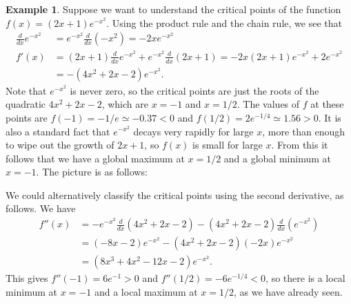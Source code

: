 \documentclass[reqno]{amsart}
\theoremstyle{definition}
\newtheorem{example}[theorem]{Example}
\begin{document}
\begin{example}
 Suppose we want to understand the critical points of the function
 $f(x)=(2x+1)e^{-x^2}$.  Using the product rule and the chain rule, we
 see that 
 \begin{align*}
  \tfrac{d}{dx}e^{-x^2} &= e^{-x^2} \tfrac{d}{dx}(-x^2) = -2xe^{-x^2} \\
  f'(x) &= (2x+1)\tfrac{d}{dx}e^{-x^2} + e^{-x^2}\tfrac{d}{dx}(2x+1) 
         = -2x(2x+1)e^{-x^2} + 2e^{-x^2}  \\
        &= -(4x^2+2x-2)e^{-x^2}.
 \end{align*}
 Note that $e^{-x^2}$ is never zero, so the critical points are just
 the roots of the quadratic $4x^2+2x-2$, which are $x=-1$ and $x=1/2$.
 The values of $f$ at these points are $f(-1)=-1/e\simeq -0.37<0$ and
 $f(1/2)=2e^{-1/4}\simeq 1.56>0$.  It is also a standard fact that
 $e^{-x^2}$ decays very rapidly for large $x$, more than enough to
 wipe out the growth of $2x+1$, so $f(x)$ is small for large $x$.
 From this it follows that we have a global maximum at $x=1/2$ and a
 global minimum at $x=-1$.  The picture is as follows:
 \begin{center}
 \end{center} 
 We could alternatively classify the critical points using the second
 derivative, as follows.  We have
 \begin{align*}
  f''(x) &= -e^{-x^2}\tfrac{d}{dx}(4x^2+2x-2)
             -(4x^2+2x-2)\tfrac{d}{dx}(e^{-x^2}) \\
   &= (-8x-2)e^{-x^2} -(4x^2+2x-2)(-2x)e^{-x^2} \\
   &= (8x^3+4x^2-12x-2)e^{-x^2}.
 \end{align*}
 This gives $f''(-1)=6e^{-1}>0$ and $f''(1/2)=-6e^{-1/4}<0$, so there
 is a local minimum at $x=-1$ and a local maximum at $x=1/2$, as we
 have already seen.
\end{example}
\end{document}
